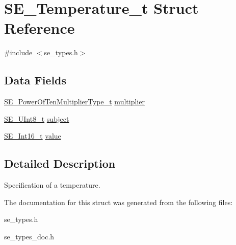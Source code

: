\hypertarget{structSE__Temperature__t}{}\section{S\+E\+\_\+\+Temperature\+\_\+t Struct Reference}
\label{structSE__Temperature__t}


{\ttfamily \#include $<$se\+\_\+types.\+h$>$}

\subsection*{Data Fields}
\begin{DoxyCompactItemize}
\item 
\hyperlink{group__PowerOfTenMultiplierType_gaf0317b781dc8dbb9cb6ac4e44a14fdef}{S\+E\+\_\+\+Power\+Of\+Ten\+Multiplier\+Type\+\_\+t} \hyperlink{group__Temperature_ga0e1fe0344bacec2b9b548fe575158e69}{multiplier}
\item 
\hyperlink{group__UInt8_gaf7c365a1acfe204e3a67c16ed44572f5}{S\+E\+\_\+\+U\+Int8\+\_\+t} \hyperlink{group__Temperature_ga59d44f7aa6422a7f439a3637c1adcf3a}{subject}
\item 
\hyperlink{group__Int16_ga0d600c7df811a7d4b4816e8965877690}{S\+E\+\_\+\+Int16\+\_\+t} \hyperlink{group__Temperature_ga466376bcb700edec44b9601bd2441605}{value}
\end{DoxyCompactItemize}


\subsection{Detailed Description}
Specification of a temperature. 

The documentation for this struct was generated from the following files\+:\begin{DoxyCompactItemize}
\item 
se\+\_\+types.\+h\item 
se\+\_\+types\+\_\+doc.\+h\end{DoxyCompactItemize}

